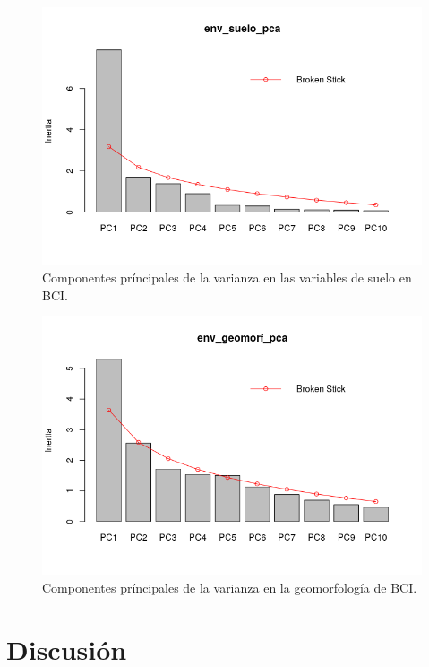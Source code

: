 \documentclass[11pt,]{article}
\begin{document}
\begin{figure}
\centering
\includegraphics{env_suelo_pca_bar_quebrd.png}
\caption{Componentes príncipales de la varianza en las variables de
suelo en BCI. \label{fig:env_suelo_pca_bar_quebrd}}
\end{figure}

\begin{figure}
\centering
\includegraphics{env_geomorf_pca_bar_quebrd.png}
\caption{Componentes príncipales de la varianza en la geomorfología de
BCI. \label{fig:env_geomorf_pca_bar_quebrd}}
\end{figure}

\section{Discusión}\label{discusiuxf3n}
\end{document}
